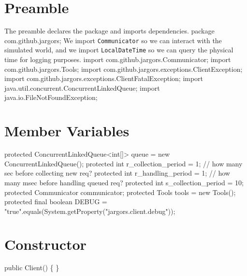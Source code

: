 \section{Preamble}
The preamble declares the package and imports dependencies.
\nwenddocs{}\endmoddef{}
package com.github.jargors;
\nwendcode{}\nwdocspar
We import {\tt{}Communicator} so we can interact with the simulated world,
and we import {\tt{}LocalDateTime} so we can query the physical time for
logging purposes.
\nwenddocs{}\plusendmoddef
import com.github.jargors.Communicator;
import com.github.jargors.Tools;
import com.github.jargors.exceptions.ClientException;
import com.github.jargors.exceptions.ClientFatalException;
import java.util.concurrent.ConcurrentLinkedQueue;
import java.io.FileNotFoundException;
\nwendcode{}\nwdocspar

\section{Member Variables}
\nwenddocs{}\endmoddef{}
protected ConcurrentLinkedQueue<int[]> queue = new ConcurrentLinkedQueue();
protected int r_collection_period = 1;  // how many sec before collecting new req?
protected int r_handling_period = 1;  // how many msec before handling queued req?
protected int s_collection_period = 10;
protected Communicator communicator;
protected Tools tools = new Tools();
protected final boolean DEBUG = "true".equals(System.getProperty("jargors.client.debug"));
\nwendcode{}\nwdocspar

\section{Constructor}
\nwenddocs{}\endmoddef{}
public Client() \{ \}
\nwendcode{}\nwdocspar

